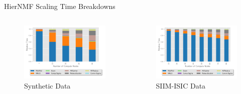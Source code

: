\documentclass{beamer}
\newcommand{\image}{SIIM-ISIC}
\begin{document}
\begin{frame}{HierNMF Scaling Time Breakdowns}
    \centering
    \begin{columns}
        \begin{column}{0.5\textwidth}
            \begin{figure}
            \includegraphics[width=\textwidth]{../plots/synthetic_hier_strongscaling.pdf}
            \caption{Synthetic  Data}
            \end{figure}
        \end{column}
        \begin{column}{0.5\textwidth}
            \begin{figure}
            \includegraphics[width=\textwidth]{../plots/realworld_hier_strongscaling.pdf}
            \caption{\image{} Data}
            \end{figure}
        \end{column}
    \end{columns}
\end{frame}
\end{document}
